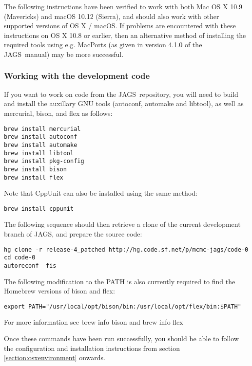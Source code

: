 \documentclass[11pt, a4paper, titlepage]{article}
\newcommand{\JAGS}{\textsf{JAGS}}
\newcommand{\code}[1]{{\bgroup{\normalfont\ttfamily #1}\egroup}}
\begin{document}
The following instructions have been verified to work with both Mac OS X 10.9 
(Mavericks) and macOS 10.12 (Sierra), and should also work with other
supported versions of OS X / macOS.  If problems are encountered with
these instructions on OS X 10.8 or earlier, then an alternative method
of installing the required tools using e.g. MacPorts (as given in version 4.1.0 of 
the \JAGS\ manual) may be more successful.

\subsubsection{Working with the development code}

If you want to work on code from the \JAGS\ repository, you will need to
build and install the auxillary GNU tools (autoconf, automake and
libtool), as well as mercurial, bison, and flex as follows:

\begin{verbatim}
brew install mercurial
brew install autoconf
brew install automake
brew install libtool
brew install pkg-config
brew install bison
brew install flex
\end{verbatim}

Note that CppUnit can also be installed using the same method:

\begin{verbatim}
brew install cppunit
\end{verbatim}

The following sequence should then retrieve a clone of the current
development branch of \JAGS, and prepare the source code:

\begin{verbatim} 
hg clone -r release-4_patched http://hg.code.sf.net/p/mcmc-jags/code-0
cd code-0
autoreconf -fis
\end{verbatim}

The following modification to the \code{PATH} is also currently 
required to find the Homebrew versions of bison and flex:

\begin{verbatim} 
export PATH="/usr/local/opt/bison/bin:/usr/local/opt/flex/bin:$PATH"
\end{verbatim}

For more information see \code{brew info bison} and \code{brew info flex}

Once these commands have been run successfully, you should be able to follow 
the configuration and installation instructions from section \ref{section:osxenvironment} 
onwards.
\end{document}
